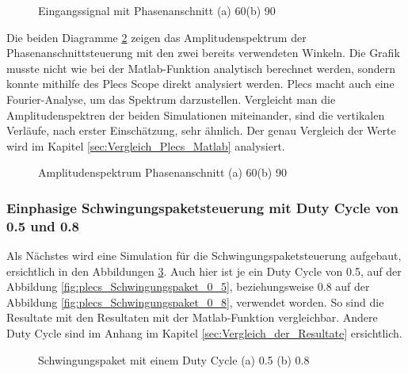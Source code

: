 \begin{figure}[ht!]
	\centering
	\qquad
	\caption{Eingangssignal mit Phasenanschnitt (a) 60\textdegree (b) 90\textdegree}
	\label{fig:Eingangssignal simuliert mit Plecs}
\end{figure}

\newpage

Die beiden Diagramme \ref{fig:plecs_Amplitudenspektrum} zeigen das Amplitudenspektrum der Phasenanschnittsteuerung mit den zwei bereits verwendeten Winkeln. Die Grafik musste nicht wie bei der Matlab-Funktion analytisch berechnet werden, sondern konnte mithilfe des Plecs Scope direkt analysiert werden. Plecs macht auch eine Fourier-Analyse, um das Spektrum darzustellen. Vergleicht man die Amplitudenspektren der beiden Simulationen miteinander, sind die vertikalen Verläufe, nach erster Einschätzung, sehr ähnlich. Der genau Vergleich der Werte wird im Kapitel \ref{sec:Vergleich_Plecs_Matlab} analysiert.  
     
\begin{figure}[ht!]
	\centering
	\qquad
	\caption{Amplitudenspektrum Phasenanschnitt (a) 60\textdegree (b) 90\textdegree}
	\label{fig:plecs_Amplitudenspektrum}
\end{figure}


\subsubsection{Einphasige Schwingungspaketsteuerung mit Duty Cycle von 0.5 und 0.8}

Als Nächstes wird eine Simulation für die Schwingungspaketsteuerung aufgebaut, ersichtlich in den Abbildungen \ref{fig:plecs_Schwingungspakete}. Auch hier ist je ein Duty Cycle von 0.5, auf der Abbildung \ref{fig:plecs_Schwingungspaket_0_5}, beziehungsweise 0.8 auf der Abbildung \ref{fig:plecs_Schwingungspaket_0_8}, verwendet worden. So sind die Resultate mit den Resultaten mit der Matlab-Funktion vergleichbar. Andere Duty Cycle sind im Anhang im Kapitel \ref{sec:Vergleich_der_Resultate} ersichtlich. 
\begin{figure}[ht!]
	\centering
	\qquad
	\caption{Schwingungspaket mit einem Duty Cycle (a) 0.5 (b) 0.8}
	\label{fig:plecs_Schwingungspakete}
\end{figure}

